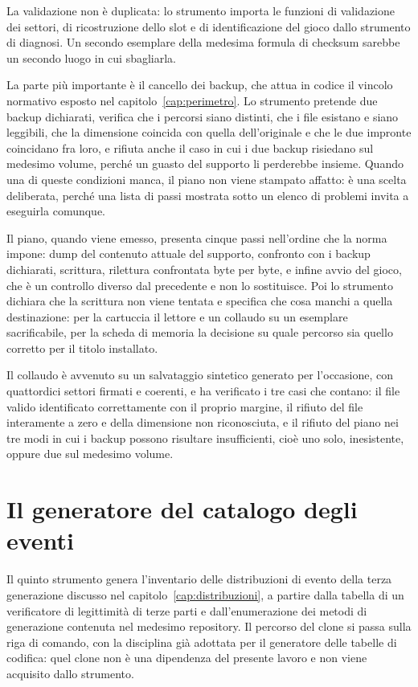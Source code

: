 La validazione non è duplicata: lo strumento importa le funzioni di validazione dei settori, di ricostruzione dello slot e di identificazione del gioco dallo strumento di diagnosi. Un secondo esemplare della medesima formula di checksum sarebbe un secondo luogo in cui sbagliarla.

La parte più importante è il cancello dei backup, che attua in codice il vincolo normativo esposto nel capitolo~\ref{cap:perimetro}. Lo strumento pretende due backup dichiarati, verifica che i percorsi siano distinti, che i file esistano e siano leggibili, che la dimensione coincida con quella dell'originale e che le due impronte coincidano fra loro, e rifiuta anche il caso in cui i due backup risiedano sul medesimo volume, perché un guasto del supporto li perderebbe insieme. Quando una di queste condizioni manca, il piano non viene stampato affatto: è una scelta deliberata, perché una lista di passi mostrata sotto un elenco di problemi invita a eseguirla comunque.

Il piano, quando viene emesso, presenta cinque passi nell'ordine che la norma impone: dump del contenuto attuale del supporto, confronto con i backup dichiarati, scrittura, rilettura confrontata byte per byte, e infine avvio del gioco, che è un controllo diverso dal precedente e non lo sostituisce. Poi lo strumento dichiara che la scrittura non viene tentata e specifica che cosa manchi a quella destinazione: per la cartuccia il lettore e un collaudo su un esemplare sacrificabile, per la scheda di memoria la decisione su quale percorso sia quello corretto per il titolo installato.

Il collaudo è avvenuto su un salvataggio sintetico generato per l'occasione, con quattordici settori firmati e coerenti, e ha verificato i tre casi che contano: il file valido identificato correttamente con il proprio margine, il rifiuto del file interamente a zero e della dimensione non riconosciuta, e il rifiuto del piano nei tre modi in cui i backup possono risultare insufficienti, cioè uno solo, inesistente, oppure due sul medesimo volume.

\section{Il generatore del catalogo degli eventi}

Il quinto strumento genera l'inventario delle distribuzioni di evento della terza generazione discusso nel capitolo~\ref{cap:distribuzioni}, a partire dalla tabella di un verificatore di legittimità di terze parti e dall'enumerazione dei metodi di generazione contenuta nel medesimo repository. Il percorso del clone si passa sulla riga di comando, con la disciplina già adottata per il generatore delle tabelle di codifica: quel clone non è una dipendenza del presente lavoro e non viene acquisito dallo strumento.

